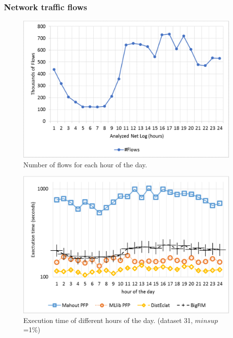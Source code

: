 \documentclass[preprint,review,12pt]{elsarticle}
\begin{document}
\subsubsection{Network traffic flows}
\label{net_exp}


\begin{figure}[!t]
\includegraphics[width=5in]{number_flows.eps}
\caption{Number of flows for each hour of the day.}
\label{number_flows}
\end{figure}

\begin{figure}[!t]
\includegraphics[width=5in]{net_logs_log.eps}
\caption{Execution time of different hours of the day.
(dataset 31, $minsup$=1\%)}
\label{net}
\end{figure}
\end{document}
